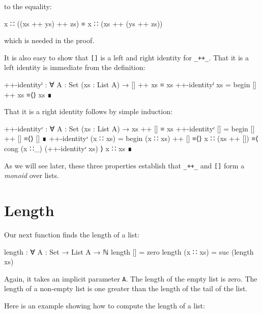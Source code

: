 to the equality:

\begin{myDisplay}
x ∷ ((xs ++ ys) ++ zs) ≡ x ∷ (xs ++ (ys ++ zs))
\end{myDisplay}

which is needed in the proof.

It is also easy to show that \texttt{{[}{]}} is a left and right
identity for \texttt{\_++\_}. That it is a left identity is immediate
from the definition:

\begin{fence}
\begin{code}
++-identityˡ : ∀ {A : Set} (xs : List A) → [] ++ xs ≡ xs
++-identityˡ xs =
  begin
    [] ++ xs
  ≡⟨⟩
    xs
  ∎
\end{code}
\end{fence}

That it is a right identity follows by simple induction:

\begin{fence}
\begin{code}
++-identityʳ : ∀ {A : Set} (xs : List A) → xs ++ [] ≡ xs
++-identityʳ [] =
  begin
    [] ++ []
  ≡⟨⟩
    []
  ∎
++-identityʳ (x ∷ xs) =
  begin
    (x ∷ xs) ++ []
  ≡⟨⟩
    x ∷ (xs ++ [])
  ≡⟨ cong (x ∷_) (++-identityʳ xs) ⟩
    x ∷ xs
  ∎
\end{code}
\end{fence}

As we will see later, these three properties establish that
\texttt{\_++\_} and \texttt{{[}{]}} form a \emph{monoid} over lists.

\hypertarget{length}{%
\section{Length}\label{length}}

Our next function finds the length of a list:

\begin{fence}
\begin{code}
length : ∀ {A : Set} → List A → ℕ
length []        =  zero
length (x ∷ xs)  =  suc (length xs)
\end{code}
\end{fence}

Again, it takes an implicit parameter \texttt{A}. The length of the
empty list is zero. The length of a non-empty list is one greater than
the length of the tail of the list.

Here is an example showing how to compute the length of a list:

